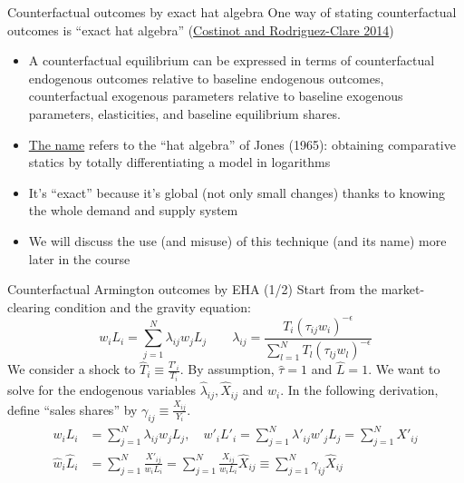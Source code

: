 \documentclass[10pt,notes=hide]{beamer}
\begin{document}
\begin{frame}{Counterfactual outcomes by exact hat algebra}
One way of stating counterfactual outcomes is ``exact hat algebra''
(\href{https://doi.org/10.1016/B978-0-444-54314-1.00004-5}{Costinot and Rodriguez-Clare 2014})
\begin{itemize}
\item A counterfactual equilibrium can be expressed in terms of
counterfactual endogenous outcomes relative to baseline endogenous outcomes,
counterfactual exogenous parameters relative to baseline exogenous parameters,
elasticities,
and
baseline equilibrium shares.
\item \href{https://tradediversion.net/2018/05/07/on-hat-algebra/}{The name} refers to the ``hat algebra'' of Jones (1965):
obtaining comparative statics by totally differentiating a model in logarithms
\item It's ``exact'' because it's global (not only small changes) thanks to knowing the whole demand and supply system
\item We will discuss the use (and misuse) of this technique (and its name) more later in the course
\end{itemize}
\end{frame}
\begin{frame}{Counterfactual Armington outcomes by EHA (1/2)}
Start from the market-clearing condition and the gravity equation:
\begin{equation*}
w_i L_i
=
\sum_{j=1}^{N} \lambda_{ij} w_j L_j 
\quad \quad
\lambda_{ij} 
=
\frac{T_{i} \left(\tau_{ij}w_i\right)^{-\epsilon}}{\sum_{l=1}^{N} T_{l}  \left(\tau_{lj}w_l\right)^{-\epsilon}}
\end{equation*}
We consider a shock to $\hat{T}_{i} \equiv \frac{T'_{i}}{T_{i}}$.
By assumption, $\hat{\tau}=1$ and $\hat{L}=1$.
We want to solve for the endogenous variables $\hat{\lambda}_{ij}, \hat{X}_{ij}$ and $\hat{w}_{i}$.
In the following derivation, 
define ``sales shares'' by
$\gamma_{ij}\equiv\frac{X_{ij}}{Y_{i}}$.
\begin{align}
w_i L_i
&=
\sum_{j=1}^{N} \lambda_{ij} w_j L_j,
\quad
w'_i L'_i
=
\sum_{j=1}^{N} \lambda'_{ij} w'_j L_j
=
\sum_{j=1}^{N} X'_{ij}
\nonumber \\
\hat{w}_i \hat{L}_i
&= 
\sum_{j=1}^{N} \frac{X'_{ij}}{w_i L_i}
=
\sum_{j=1}^{N} \frac{X_{ij}}{w_i L_i} \hat{X}_{ij}
\equiv
\sum_{j=1}^{N} \gamma_{ij} \hat{X}_{ij}  \label{eqn:20180428:1sector:hatincome}
\end{align}
\end{frame}
\end{document}
